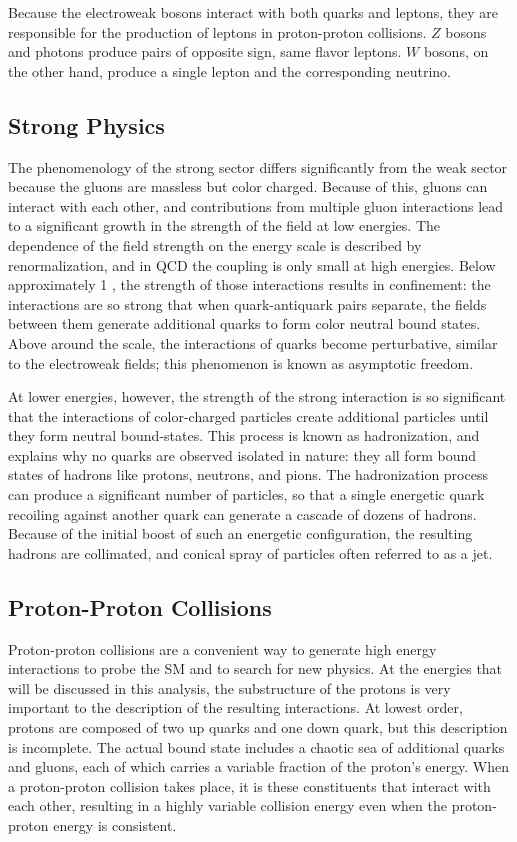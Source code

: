 Because the electroweak bosons interact with both quarks and leptons, they are responsible for the production of leptons in proton-proton collisions.
$Z$ bosons and photons produce pairs of opposite sign, same flavor leptons.
$W$ bosons, on the other hand, produce a single lepton and the corresponding neutrino.

\subsection{Strong Physics}
\label{sec:strong}

The phenomenology of the strong sector differs significantly from the weak sector because the gluons are massless but color charged.
Because of this, gluons can interact with each other, and contributions from multiple gluon interactions lead to a significant growth in the strength of the field at low energies.
The dependence of the field strength on the energy scale is described by renormalization, and in \ac{QCD} the coupling is only small at high energies.
Below approximately 1 \GeV, the strength of those interactions results in confinement: the interactions are so strong that when quark-antiquark pairs separate, the fields between them generate additional quarks to form color neutral bound states. 
Above around the \GeV scale, the interactions of quarks become perturbative, similar to the electroweak fields; this phenomenon is known as asymptotic freedom.

At lower energies, however, the strength of the strong interaction is so significant that the interactions of color-charged particles create additional particles until they form neutral bound-states.
This process is known as hadronization, and explains why no quarks are observed isolated in nature: they all form bound states of hadrons like protons, neutrons, and pions.
The hadronization process can produce a significant number of particles, so that a single energetic quark recoiling against another quark can generate a cascade of dozens of hadrons.
Because of the initial boost of such an energetic configuration, the resulting hadrons are collimated, and conical spray of particles often referred to as a jet.

\subsection{Proton-Proton Collisions}

Proton-proton collisions are a convenient way to generate high energy interactions to probe the \ac{SM} and to search for new physics.
At the energies that will be discussed in this analysis, the substructure of the protons is very important to the description of the resulting interactions.
At lowest order, protons are composed of two up quarks and one down quark, but this description is incomplete.
The actual bound state includes a chaotic sea of additional quarks and gluons, each of which carries a variable fraction of the proton's energy.
When a proton-proton collision takes place, it is these constituents that interact with each other, resulting in a highly variable collision energy even when the proton-proton energy is consistent.

